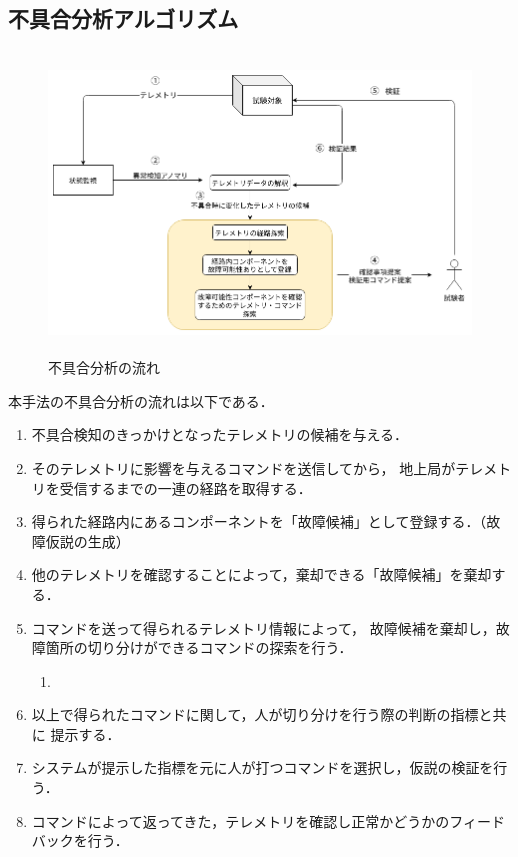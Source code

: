\documentclass[11pt]{article}
\begin{document}
\subsection{不具合分析アルゴリズム}

\begin{figure}[H]
   \centering
      \includegraphics[height=8.0cm]{figure/fault_diagnosis_flow.png}
      \caption{不具合分析の流れ}
      \label{fig:fault_diagnosis}
\end{figure}


本手法の不具合分析の流れは以下である．
\begin{enumerate}
   \item 不具合検知のきっかけとなったテレメトリの候補を与える．
   \item そのテレメトリに影響を与えるコマンドを送信してから，
   地上局がテレメトリを受信するまでの一連の経路を取得する．
   \item 得られた経路内にあるコンポーネントを「故障候補」として登録する．（故障仮説の生成）
   \item 他のテレメトリを確認することによって，棄却できる「故障候補」を棄却する．
   \item コマンドを送って得られるテレメトリ情報によって，
   故障候補を棄却し，故障箇所の切り分けができるコマンドの探索を行う．
   \begin{enumerate}
      \item 
   \end{enumerate}
   \item 以上で得られたコマンドに関して，人が切り分けを行う際の判断の指標と共に
   提示する．
   \item システムが提示した指標を元に人が打つコマンドを選択し，仮説の検証を行う．
   \item コマンドによって返ってきた，テレメトリを確認し正常かどうかのフィードバックを行う．
\end{enumerate}
\end{document}
